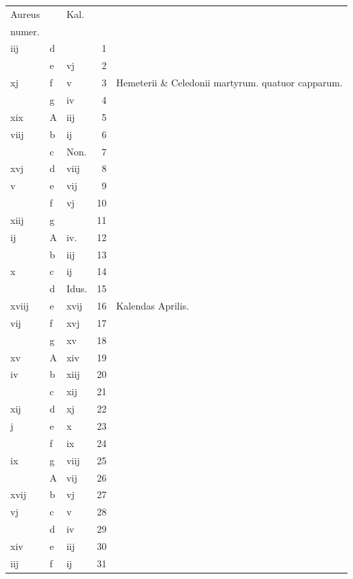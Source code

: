 \documentclass[letter,11pt]{book}
\begin{document}
\begin{center}
\begin{tabular}{l | l | l | r | l}
\color{Red}Aureus & & \color{Red} Kal. & \\
\color{Red}numer. & & & \\
\color{Red} iij & d & & 1 & \\
\color{Red}  & e & \color{Red} vj & 2 & \\
\color{Red} xj & f & \color{Red} v & 3 & Hemeterii \& Celedonii martyrum. \color{Red} quatuor capparum. \\
\color{Red}  & g & \color{Red} iv & 4 & \\
\color{Red} xix & \color{Red} A & \color{Red} iij & 5 & \\
\color{Red} viij & b & \color{Red} ij & 6 & \\
\color{Red}  & c & Non. & 7 & \\
\color{Red} xvj & d & \color{Red} viij & 8 & \\
\color{Red} v & e & \color{Red} vij & 9 & \\
\color{Red}  & f & \color{Red} vj & 10 & \\
\color{Red} xiij & g & & 11 & \\%
\color{Red} ij & \color{Red} A & \color{Red} iv. & 12 & \\
\color{Red}  & b & \color{Red} iij & 13 & \\
\color{Red} x & c & \color{Red} ij & 14 & \\
\color{Red}  & d & Idus. & 15 & \\
\color{Red} xviij & e & \color{Red} xvij & 16 & \qquad \color{Red} Kalendas Aprilis. \\
\color{Red} vij & f & \color{Red} xvj & 17 & \\
\color{Red}  & g & \color{Red} xv & 18 & \\
\color{Red} xv & \color{Red} A & \color{Red} xiv & 19 & \\
\color{Red} iv & b & \color{Red} xiij & 20 & \\
\color{Red}  & c & \color{Red} xij & 21 & \\
\color{Red} xij & d & \color{Red} xj & 22 & \\
\color{Red} j & e & \color{Red} x & 23 & \\
\color{Red}  & f & \color{Red} ix & 24 & \\
\color{Red} ix & g & \color{Red} viij & 25 & \\
\color{Red}  & \color{Red} A & \color{Red} vij & 26 & \\
\color{Red} xvij & b & \color{Red} vj & 27 & \\
\color{Red} vj & c & \color{Red} v & 28 & \\
\color{Red}  & d & \color{Red} iv & 29 & \\
\color{Red} xiv & e & \color{Red} iij & 30 & \\
\color{Red} iij & f & \color{Red} ij & 31 & \\
\end{tabular}
\end{center}
\end{document}
